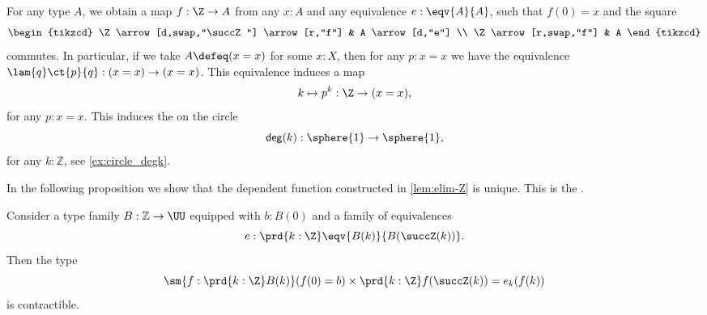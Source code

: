 \begin{eg}
For any type $A$, we obtain a map $f:\Z\to A$ from any $x:A$ and any equivalence $e:\eqv{A}{A}$, such that $f(0)=x$ and the square
\begin{equation*}
\begin{tikzcd}
\Z \arrow[d,swap,"\succZ"] \arrow[r,"f"] & A \arrow[d,"e"] \\
\Z \arrow[r,swap,"f"] & A
\end{tikzcd}
\end{equation*}
commutes. In particular, if we take $A\defeq (x=x)$ for some $x:X$, then for any $p:x=x$ we have the equivalence $\lam{q}\ct{p}{q}:(x=x)\to (x=x)$. This equivalence induces a map
\begin{equation*}
k\mapsto p^k : \Z \to (x=x),
\end{equation*}
for any $p:x=x$. This induces the  on the circle
\begin{equation*}
\mathsf{deg}(k) : \sphere{1}\to\sphere{1},
\end{equation*}
for any $k:\mathbb{Z}$, see \cref{ex:circle_degk}.
\end{eg}

In the following proposition we show that the dependent function constructed in \cref{lem:elim-Z} is unique. This is the .

\begin{prp}\label{prp:unique-elim-Z}
  Consider a type family $B:\mathbb{Z}\to\UU$ equipped with $b:B(0)$ and a family of equivalences
  \begin{equation*}
    e:\prd{k:\Z} \eqv{B(k)}{B(\succZ (k))}.
  \end{equation*}
  Then the type
  \begin{equation*}
    \sm{f:\prd{k:\Z}B(k)}(f(0)=b)\times\prd{k:\Z}f(\succZ (k))=e_k(f(k))
  \end{equation*}
  is contractible.
\end{prp}


